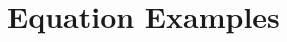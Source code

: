 \documentclass[]{article}
\title{}
\author{}
\begin{document}
\maketitle

\begin{abstract}

\end{abstract}

\section{Equation Examples}



\newpage
\end{document}

